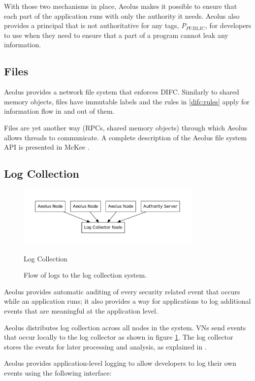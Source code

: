 With those two mechanisms in place, Aeolus makes it possible to ensure that each part of the application runs with only the authority it needs. Aeolus also provides a principal that is not authoritative for any tags, \emph{P$_{PUBLIC}$}, for developers to use when they need to ensure that a part of a program cannot leak any information.

\subsection{Files}

Aeolus provides a network file system that enforces DIFC. Similarly to shared memory objects, files have immutable labels and the rules in \ref{difc:rules} apply for information flow in and out of them.

Files are yet another way (RPCs, shared memory objects) through which Aeolus allows threads to communicate. A complete description of the Aeolus file system API is presented in McKee \cite{mckee}.

\subsection{Log Collection}
\label{aeolus:logging}

\begin{figure}[h]
\centering
\includegraphics[height=8em]{figures/event-logging-overview}
\caption*{Log Collection}
\caption[Aeolus Log Collection]{Flow of logs to the log collection system.}
\label{fig:log-flow}
\end{figure}

Aeolus provides automatic auditing of every security related event that occurs while an application runs; it also provides a way for applications to log additional events that are meaningful at the application level.

Aeolus distributes log collection across all nodes in the system. VNs send events that occur locally to the log collector as shown in figure \ref{fig:log-flow}. The log collector stores the events for later processing and analysis, as explained in \cite{blanks}.

Aeolus provides application-level logging to allow developers to log their own events using the following interface:

